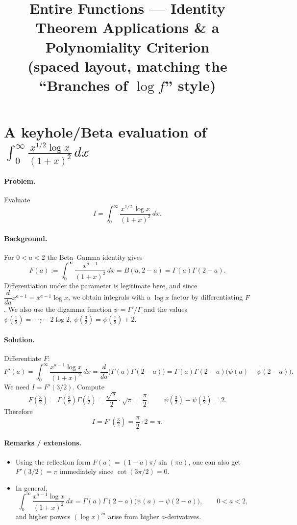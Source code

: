 \documentclass[12pt,a4paper]{article}
\title{\Large Entire Functions — Identity Theorem Applications \& a Polynomiality Criterion\\[0.3em]
	\large (spaced layout, matching the “Branches of $\log f$” style)}
\author{}
\date{}
\begin{document}
	\maketitle

\section*{A keyhole/Beta evaluation of \(\displaystyle \int_{0}^{\infty}\frac{x^{1/2}\log x}{(1+x)^2}\,dx\)}

\paragraph{Problem.}
Evaluate
\[
I=\int_{0}^{\infty}\frac{x^{1/2}\,\log x}{(1+x)^2}\,dx .
\]

\bigskip

\paragraph{Background.}
For \(0<a<2\) the Beta–Gamma identity gives
\[
F(a):=\int_{0}^{\infty}\frac{x^{a-1}}{(1+x)^2}\,dx
=B(a,2-a)=\Gamma(a)\Gamma(2-a).
\]
Differentiation under the parameter is legitimate here, and since
\(\dfrac{d}{da}x^{a-1}=x^{a-1}\log x\), we obtain integrals with a \(\log x\) factor
by differentiating \(F\).
We also use the digamma function \(\psi=\Gamma'/\Gamma\) and the values
\(\psi(\tfrac12)=-\gamma-2\log2\), \(\psi(\tfrac32)=\psi(\tfrac12)+2\).

\bigskip

\paragraph{Solution.}
Differentiate \(F\):
\[
F'(a)=\int_{0}^{\infty}\frac{x^{a-1}\log x}{(1+x)^2}\,dx
=\frac{d}{da}\big(\Gamma(a)\Gamma(2-a)\big)
=\Gamma(a)\Gamma(2-a)\big(\psi(a)-\psi(2-a)\big).
\]
We need \(I=F'(3/2)\).  Compute
\[
F\!\left(\tfrac32\right)
=\Gamma\!\left(\tfrac32\right)\Gamma\!\left(\tfrac12\right)
=\frac{\sqrt\pi}{2}\cdot\sqrt\pi=\frac{\pi}{2},
\qquad
\psi\!\left(\tfrac32\right)-\psi\!\left(\tfrac12\right)=2.
\]
Therefore
\[
I=F'\!\left(\tfrac32\right)
=\frac{\pi}{2}\cdot 2
=\boxed{\pi}.
\]

\bigskip

\paragraph{Remarks / extensions.}
\begin{itemize}
	\item Using the reflection form \(F(a)=(1-a)\pi/\sin(\pi a)\), one can also get
	\(F'(3/2)=\pi\) immediately since \(\cot(3\pi/2)=0\).
	\item In general,
	\[
	\int_{0}^{\infty}\frac{x^{a-1}\log x}{(1+x)^2}\,dx
	=\Gamma(a)\Gamma(2-a)\big(\psi(a)-\psi(2-a)\big),\qquad 0<a<2,
	\]
	and higher powers \((\log x)^m\) arise from higher \(a\)-derivatives.
\end{itemize}
\end{document}
